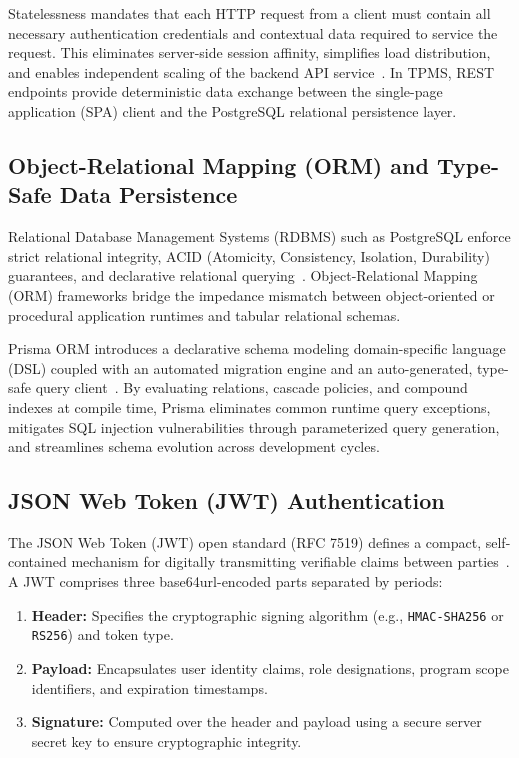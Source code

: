 Statelessness mandates that each HTTP request from a client must contain all necessary authentication credentials and contextual data required to service the request. This eliminates server-side session affinity, simplifies load distribution, and enables independent scaling of the backend API service~\citep{martin2017clean}. In TPMS, REST endpoints provide deterministic data exchange between the single-page application (SPA) client and the PostgreSQL relational persistence layer.

\subsection{Object-Relational Mapping (ORM) and Type-Safe Data Persistence}
Relational Database Management Systems (RDBMS) such as PostgreSQL enforce strict relational integrity, ACID (Atomicity, Consistency, Isolation, Durability) guarantees, and declarative relational querying~\citep{postgresql2024manual}. Object-Relational Mapping (ORM) frameworks bridge the impedance mismatch between object-oriented or procedural application runtimes and tabular relational schemas.

Prisma ORM introduces a declarative schema modeling domain-specific language (DSL) coupled with an automated migration engine and an auto-generated, type-safe query client~\citep{prisma2024orm}. By evaluating relations, cascade policies, and compound indexes at compile time, Prisma eliminates common runtime query exceptions, mitigates SQL injection vulnerabilities through parameterized query generation, and streamlines schema evolution across development cycles.

\subsection{JSON Web Token (JWT) Authentication}
The JSON Web Token (JWT) open standard (RFC 7519) defines a compact, self-contained mechanism for digitally transmitting verifiable claims between parties~\citep{jones2015jwt}. A JWT comprises three base64url-encoded parts separated by periods:
\begin{enumerate}
    \item \textbf{Header:} Specifies the cryptographic signing algorithm (e.g., \texttt{HMAC-SHA256} or \texttt{RS256}) and token type.
    \item \textbf{Payload:} Encapsulates user identity claims, role designations, program scope identifiers, and expiration timestamps.
    \item \textbf{Signature:} Computed over the header and payload using a secure server secret key to ensure cryptographic integrity.
\end{enumerate}

